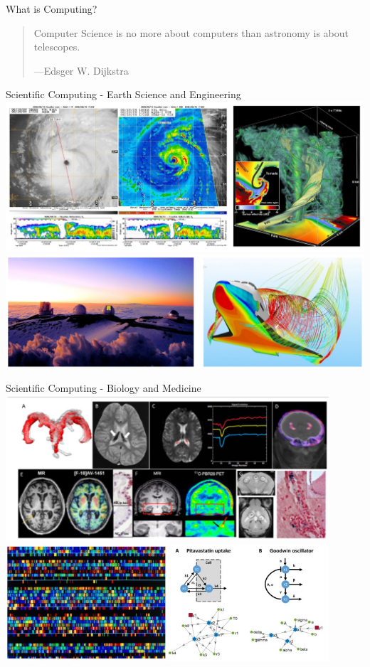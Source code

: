 \documentclass[]{beamer}
\begin{document}
\begin{frame}{What is Computing?}

    \begin{quote}
        Computer Science is no more about computers than astronomy is about telescopes.
        \begin{flushleft}
            ---Edsger W. Dijkstra
        \end{flushleft}
    \end{quote}
    
\end{frame}

\begin{frame}{Scientific Computing - Earth Science and Engineering}
    \includegraphics[width=\textwidth]{imgs/vis_0.jpg}
    \includegraphics[width=\textwidth]{imgs/vis_1.jpg}
\end{frame}

\begin{frame}{Scientific Computing - Biology and Medicine}
    \includegraphics[width=0.9\textwidth]{imgs/vis_2.jpg}
    \includegraphics[width=0.9\textwidth]{imgs/vis_3.jpg}
\end{frame}
\end{document}
